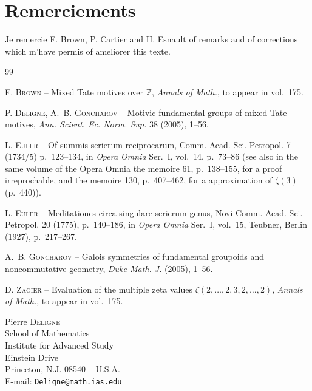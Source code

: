 \documentclass[11pt,a4paper]{article}
\theoremstyle{plain}
\theoremstyle{definition}
\newcommand{\Z}{\mathbb{Z}}
\begin{document}
\section*{Remerciements}

Je remercie F. Brown, P. Cartier and H. Esnault of remarks and of corrections which m'have permis of ameliorer this texte.

\begin{thebibliography}{99}

F. \textsc{Brown} -- Mixed Tate motives over $\Z$, \textit{Annals of Math.}, to appear in vol.~175.

P. \textsc{Deligne}, A.~B. \textsc{Goncharov} -- Motivic fundamental groups of mixed Tate motives, \textit{Ann. Scient. Ec. Norm. Sup.} 38 (2005), 1--56.

L. \textsc{Euler} -- Of summis serierum reciprocarum, Comm. Acad. Sci. Petropol. 7 (1734/5) p.~123--134, in \textit{Opera Omnia} Ser.~I, vol.~14, p.~73--86 (see also in the same volume of the Opera Omnia the memoire 61, p.~138--155, for a proof irreprochable, and the memoire 130, p.~407--462, for a approximation of $\zeta(3)$ (p.~440)).

L. \textsc{Euler} -- Meditationes circa singulare serierum genus, Novi Comm. Acad. Sci. Petropol. 20 (1775), p.~140--186, in \textit{Opera Omnia} Ser.~I, vol.~15, Teubner, Berlin (1927), p.~217--267.

A.~B. \textsc{Goncharov} -- Galois symmetries of fundamental groupoids and noncommutative geometry, \textit{Duke Math. J.} (2005), 1--56.

D. \textsc{Zagier} -- Evaluation of the multiple zeta values $\zeta(2,\ldots,2,3,2,\ldots,2)$, \textit{Annals of Math.}, to appear in vol.~175.

\end{thebibliography}

\vspace{1em}
\noindent Pierre \textsc{Deligne}\\
School of Mathematics\\
Institute for Advanced Study\\
Einstein Drive\\
Princeton, N.J. 08540 -- U.S.A.\\
E-mail: \texttt{Deligne@math.ias.edu}
\end{document}
